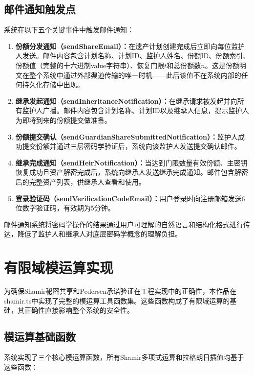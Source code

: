 \documentclass[UTF8,a4paper,zihao=-4,openany]{ctexrep}
\begin{document}
\subsection{邮件通知触发点}

系统在以下五个关键事件中触发邮件通知：

\begin{enumerate}
  \item \textbf{份额分发通知（sendShareEmail）：}在遗产计划创建完成后立即向每位监护人发送。邮件内容包含计划名称、计划ID、监护人姓名、份额ID、份额索引、份额值（完整的十六进制value字符串）、恢复门限$t$和总份额数$n$。这是份额明文在整个系统中通过外部渠道传输的唯一时机——此后该值不在系统内部的任何持久化存储中出现。
  \item \textbf{继承发起通知（sendInheritanceNotification）：}在继承请求被发起并向所有监护人广播。邮件内容包含计划名称、计划ID以及继承人信息，提示监护人为即将到来的份额提交做准备。
  \item \textbf{份额提交确认（sendGuardianShareSubmittedNotification）：}监护人成功提交份额并通过三层密码学验证后，系统向该监护人发送提交确认邮件。
  \item \textbf{继承完成通知（sendHeirNotification）：}当达到门限数量有效份额、主密钥恢复成功且资产解密完成后，系统向继承人发送继承完成通知。邮件包含解密后的完整资产列表，供继承人查看和使用。
  \item \textbf{登录验证码（sendVerificationCodeEmail）：}用户登录时向注册邮箱发送6位数字验证码，有效期为5分钟。
\end{enumerate}

邮件通知系统将密码学操作的结果通过用户可理解的自然语言和结构化格式进行传达，降低了监护人和继承人对底层密码学概念的理解负担。

\section{有限域模运算实现}

为确保Shamir秘密共享和Pedersen承诺验证在工程实现中的正确性，本作品在shamir.ts中实现了完整的模运算工具函数集。这些函数构成了有限域运算的基础，其正确性直接影响整个系统的安全性。

\subsection{模运算基础函数}

系统实现了三个核心模运算函数，所有Shamir多项式运算和拉格朗日插值均基于这些函数：
\end{document}
